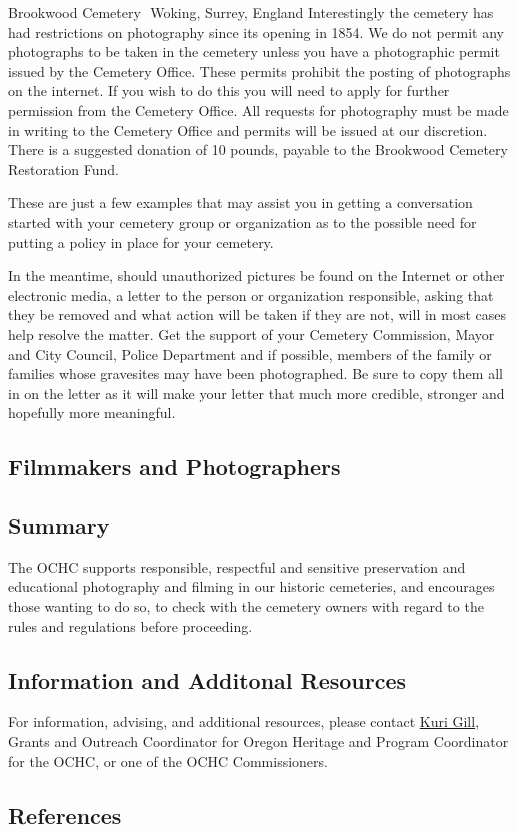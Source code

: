 \documentclass[]{article}
\begin{document}
Brookwood Cemetery  Woking, Surrey, England Interestingly the cemetery
has had restrictions on photography since its opening in 1854. We do not
permit any photographs to be taken in the cemetery unless you have a
photographic permit issued by the Cemetery Office. These permits
prohibit the posting of photographs on the internet. If you wish to do
this you will need to apply for further permission from the Cemetery
Office. All requests for photography must be made in writing to the
Cemetery Office and permits will be issued at our discretion. There is a
suggested donation of 10 pounds, payable to the Brookwood Cemetery
Restoration Fund.

These are just a few examples that may assist you in getting a
conversation started with your cemetery group or organization as to the
possible need for putting a policy in place for your cemetery.

In the meantime, should unauthorized pictures be found on the Internet
or other electronic media, a letter to the person or organization
responsible, asking that they be removed and what action will be taken
if they are not, will in most cases help resolve the matter. Get the
support of your Cemetery Commission, Mayor and City Council, Police
Department and if possible, members of the family or families whose
gravesites may have been photographed. Be sure to copy them all in on
the letter as it will make your letter that much more credible, stronger
and hopefully more meaningful.

\subsection{Filmmakers and
Photographers}\label{filmmakers-and-photographers}

\subsection{Summary}\label{summary}

The OCHC supports responsible, respectful and sensitive preservation and
educational photography and filming in our historic cemeteries, and
encourages those wanting to do so, to check with the cemetery owners
with regard to the rules and regulations before proceeding.

\subsection{Information and Additonal
Resources}\label{information-and-additonal-resources}

For information, advising, and additional resources, please contact
\href{mailto:Kuri.Gill@oregon.gov}{Kuri Gill}, Grants and Outreach
Coordinator for Oregon Heritage and Program Coordinator for the OCHC, or
one of the OCHC Commissioners.

\subsection{References}\label{references}
\end{document}
